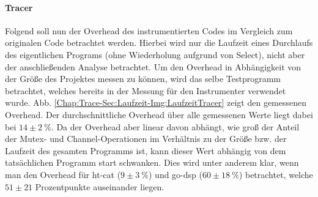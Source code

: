 \paragraph{Tracer} Folgend soll nun der Overhead des instrumentierten Codes 
im Vergleich zum originalen Code betrachtet werden.
Hierbei wird nur die Laufzeit eines Durchlaufs des eigentlichen Programs
(ohne Wiederholung aufgrund von Select), 
nicht aber der anschließenden 
Analyse betrachtet. Um den Overhead in Abhängigkeit von der Größe des Projektes messen 
zu können, wird das selbe Testprogramm betrachtet, welches bereits in der Messung 
für den Instrumenter verwendet wurde. Abb. \ref{Chap:Trace-Sec:Laufzeit-Img:LaufzeitTracer}
zeigt den gemessenen Overhead. Der durchschnittliche Overhead über alle gemessenen Werte 
liegt dabei bei $14 \pm 2\ \%$. Da der Overhead aber linear davon abhängt, 
wie groß der Anteil der Mutex- und Channel-Operationen im Verhältnis zu 
der Größe bzw. der Laufzeit des gesamten Programms ist, kann dieser Wert abhängig 
von dem tatsächlichen Programm start schwanken. Dies wird unter anderem klar, wenn man 
den Overhead für ht-cat ($9 \pm 3\ \%$) und go-dsp ($60\pm 18\ \%$) betrachtet, welche $51 \pm 21$ 
Prozentpunkte auseinander liegen. 
